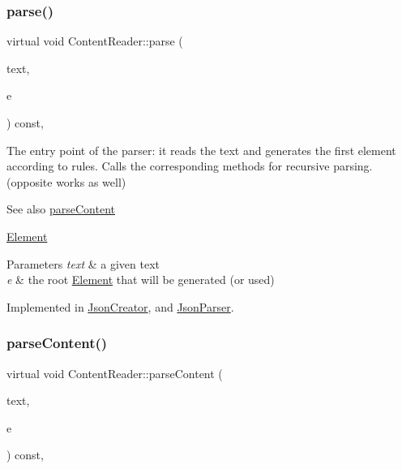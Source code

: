 \subsubsection{\texorpdfstring{parse()}{parse()}}
{\footnotesize\ttfamily virtual void Content\+Reader\+::parse (\begin{DoxyParamCaption}\item[{std\+::string \&}]{text,  }\item[{\mbox{\hyperlink{classElement}{Element}} $\ast$$\ast$}]{e }\end{DoxyParamCaption}) const\hspace{0.3cm}{\ttfamily [pure virtual]}, {\ttfamily [inherited]}}

The entry point of the parser\+: it reads the text and generates the first element according to rules. Calls the corresponding methods for recursive parsing. (opposite works as well) \begin{DoxySeeAlso}{See also}
\mbox{\hyperlink{classContentReader_a7eef37b8b9761e21c0a3907ff94c72f7}{parse\+Content}} 

\mbox{\hyperlink{classElement}{Element}}
\end{DoxySeeAlso}

\begin{DoxyParams}{Parameters}
{\em text} & a given text \\
\hline
{\em e} & the root \mbox{\hyperlink{classElement}{Element}} that will be generated (or used) \\
\hline
\end{DoxyParams}


Implemented in \mbox{\hyperlink{classJsonCreator_a505ff309c6b144d29478804b0e187c6f}{Json\+Creator}}, and \mbox{\hyperlink{classJsonParser_a3ec3a9fcc8a63f987b4749d60b0568df}{Json\+Parser}}.

\mbox{\label{classContentReader_a7eef37b8b9761e21c0a3907ff94c72f7}} 
\subsubsection{\texorpdfstring{parse\+Content()}{parseContent()}\hspace{0.1cm}{\footnotesize\ttfamily [1/6]}}
{\footnotesize\ttfamily virtual void Content\+Reader\+::parse\+Content (\begin{DoxyParamCaption}\item[{std\+::string \&}]{text,  }\item[{\mbox{\hyperlink{classElementInt}{Element\+Int}} $\ast$}]{e }\end{DoxyParamCaption}) const\hspace{0.3cm}{\ttfamily [pure virtual]}, {\ttfamily [inherited]}}


